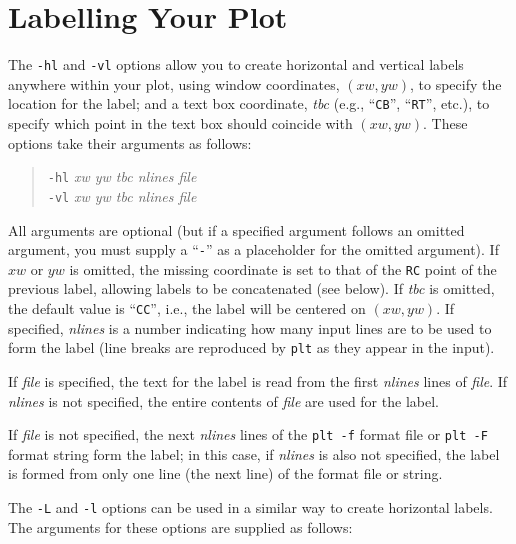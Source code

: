 \documentclass{book}
\begin{document}
\chapter{Labelling Your Plot \label{sec:labelling}}

%
%
%
%
The {\tt -hl} and {\tt -vl} options allow you to create horizontal and vertical
labels anywhere within your plot, using window coordinates, $(xw,yw)$, to
specify the location for the label; and a text box coordinate, {\em tbc} (e.g.,
``{\tt CB}'', ``{\tt RT}'', etc.), to specify which point in the text box
should coincide with $(xw,yw)$. These options take their arguments as follows:

\begin{quote}
{\tt -hl} \emph{xw yw tbc nlines file}\\
{\tt -vl} \emph{xw yw tbc nlines file}
\end{quote}

All arguments are optional (but if a specified argument follows an
omitted argument, you must supply a ``{\tt -}'' as a placeholder for
the omitted argument).  If $xw$ or $yw$ is omitted, the missing
coordinate is set to that of the {\tt RC} point of the previous
label, allowing labels to be concatenated (see below).  If
{\em tbc} is omitted, the default value is ``{\tt CC}'', i.e., the
label will be centered on $(xw,yw)$.  If specified, {\em nlines} is a
number indicating how many input lines are to be used to form the
label (line breaks are reproduced by {\tt plt} as they appear in the
input).

If {\em file} is specified, the text for the label is read from the first
{\em nlines} lines of {\em file}.  If {\em nlines} is not specified, the
entire contents of {\em file} are used for the label.

%
%
If {\em file} is not specified, the next {\em nlines} lines of the {\tt plt -f}
format file or {\tt plt -F} format string form the label; in this case, if {\em
nlines} is also not specified, the label is formed from only one line (the next
line) of the format file or string.

%
%
The {\tt -L} and {\tt -l} options can be used in a similar way to create
horizontal labels.  The arguments for these options are supplied as follows:
\end{document}
